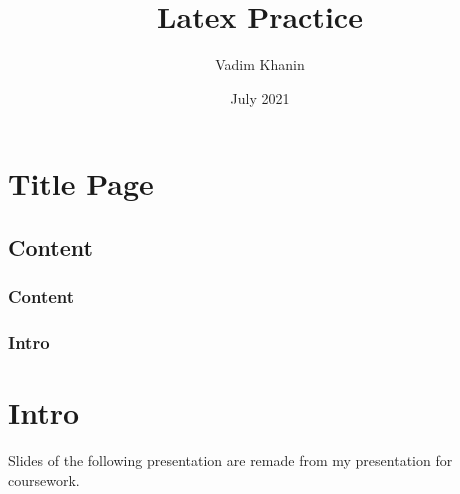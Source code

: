 \documentclass[10pt,pdf]{beamer}
\title{Latex Practice}
\author{Vadim Khanin}
\institute{HSE}
\date{ July 2021}
\begin{document}
\section{Title Page}
\frame{\titlepage}

\begin{center}
\section{Content}
\begin{frame}
\frametitle{Content}
\tableofcontents
\end{frame}
\end{center}

\begin{frame}
\frametitle{Intro}
\section{Intro}
Slides of the following presentation are remade from my presentation for coursework.
\end{frame}
\end{document}
